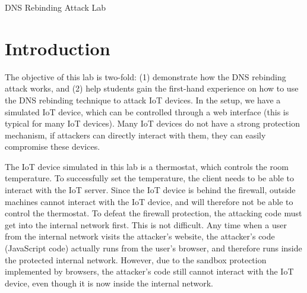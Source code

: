 
\newcommand{\commonfolder}{../../common-files}





\newcommand{\rebindingFigs}{./Figs}





\begin{center}
{\LARGE DNS Rebinding Attack Lab}
\end{center}



\setcounter{task}{1}
\newcommand{\tasks} {\bf {\noindent (\arabic{task})} \addtocounter{task}{1} \,}



\section{Introduction}


The objective of this lab is two-fold: (1) demonstrate how 
the DNS rebinding attack works, and (2) help students gain
the first-hand experience on how to use the DNS rebinding
technique to attack IoT devices. In the setup, we have a simulated IoT device, 
which can be controlled through
a web interface (this is typical for many IoT devices). Many IoT devices do not have 
a strong protection mechanism, if attackers can directly interact with them, they can
easily compromise these devices. 


The IoT device simulated in this lab is a thermostat, 
which controls the room temperature. 
To successfully set the temperature, the client needs to be able to interact with the
IoT server. Since the IoT device is behind the firewall, outside machines
cannot interact with the IoT device, and will therefore not be able to 
control the thermostat. To defeat the firewall protection, the attacking code must get into the 
internal network first. This is not difficult. Any time when a user from 
the internal network visits the attacker's website, the attacker's code (JavaScript
code) actually runs from the user's browser, and therefore runs inside the 
protected internal network. However, due to the sandbox protection implemented 
by browsers, the attacker's code still cannot interact with the IoT device, even though it 
is now inside the internal network. 


